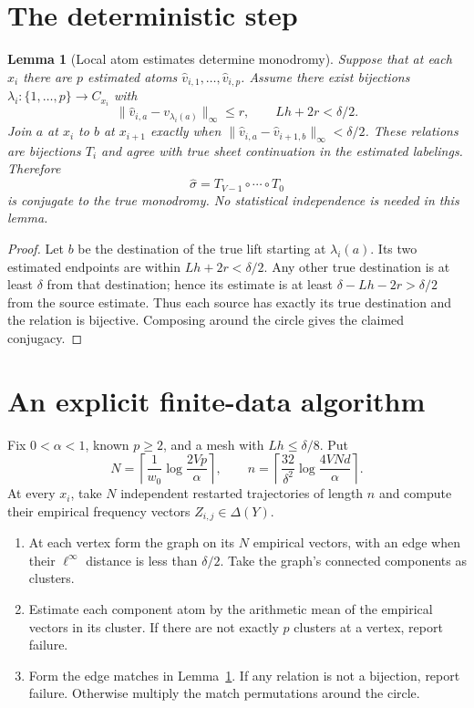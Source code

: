 \documentclass[11pt]{article}
\newtheorem{lemma}[theorem]{Lemma}
\theoremstyle{remark}\newtheorem{remark}[theorem]{Remark}
\begin{document}
\section{The deterministic step}
\begin{lemma}[Local atom estimates determine monodromy]\label{lem:match}
Suppose that at each $x_i$ there are $p$ estimated atoms $\widehat v_{i,1},\ldots,\widehat v_{i,p}$. Assume there exist bijections $\lambda_i:\{1,\ldots,p\}\to C_{x_i}$ with
\[
 \|\widehat v_{i,a}-v_{\lambda_i(a)}\|_\infty\leq r,
 \qquad Lh+2r<\delta/2.
\]
Join $a$ at $x_i$ to $b$ at $x_{i+1}$ exactly when
$\|\widehat v_{i,a}-\widehat v_{i+1,b}\|_\infty<\delta/2$.
These relations are bijections $T_i$ and agree with true sheet continuation in the estimated labelings. Therefore
\[
 \widehat\sigma=T_{V-1}\circ\cdots\circ T_0
\]
is conjugate to the true monodromy. No statistical independence is needed in this lemma.
\end{lemma}
\begin{proof}
Let $b$ be the destination of the true lift starting at $\lambda_i(a)$. Its two estimated endpoints are within $Lh+2r<\delta/2$. Any other true destination is at least $\delta$ from that destination; hence its estimate is at least $\delta-Lh-2r>\delta/2$ from the source estimate. Thus each source has exactly its true destination and the relation is bijective. Composing around the circle gives the claimed conjugacy.
\end{proof}

\section{An explicit finite-data algorithm}
Fix $0<\alpha<1$, known $p\geq2$, and a mesh with $Lh\leq\delta/8$. Put
\begin{equation}\label{eq:counts}
 N=\left\lceil\frac1{w_0}\log\frac{2Vp}{\alpha}\right\rceil,
 \qquad
 n=\left\lceil\frac{32}{\delta^2}\log\frac{4VNd}{\alpha}\right\rceil.
\end{equation}
At every $x_i$, take $N$ independent restarted trajectories of length $n$ and compute their empirical frequency vectors $Z_{i,j}\in\Delta(Y)$.
\begin{enumerate}
\item At each vertex form the graph on its $N$ empirical vectors, with an edge when their $\ell^\infty$ distance is less than $\delta/2$. Take the graph's connected components as clusters.
\item Estimate each component atom by the arithmetic mean of the empirical vectors in its cluster. If there are not exactly $p$ clusters at a vertex, report failure.
\item Form the edge matches in Lemma~\ref{lem:match}. If any relation is not a bijection, report failure. Otherwise multiply the match permutations around the circle.
\end{enumerate}
\end{document}
